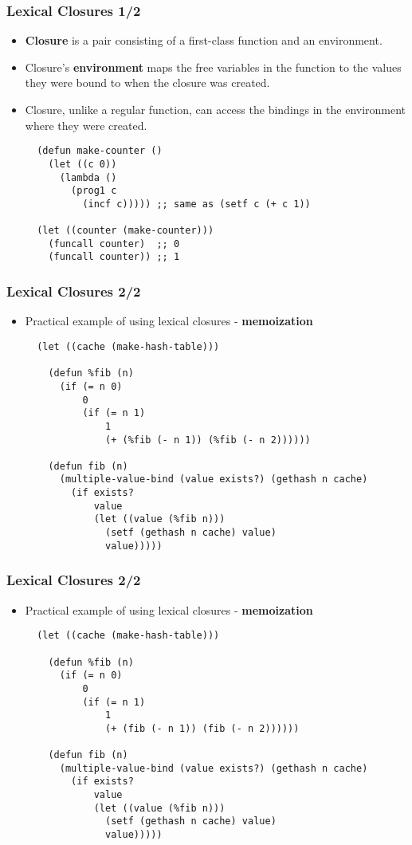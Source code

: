 \documentclass{beamer}
\begin{document}
\begin{frame}[fragile]
  \frametitle{Lexical Closures 1/2}
  \begin{itemize}
  \item \textbf{Closure} is a pair consisting of a first-class function and an
    environment.
  \item Closure's \textbf{environment} maps the free variables in the function
    to the values they were bound to when the closure was created.
  \item Closure, unlike a regular function, can access the bindings in the
    environment where they were created.
\begin{verbatim}
  (defun make-counter ()
    (let ((c 0))
      (lambda () 
        (prog1 c
          (incf c))))) ;; same as (setf c (+ c 1))

  (let ((counter (make-counter)))
    (funcall counter)  ;; 0
    (funcall counter)) ;; 1
\end{verbatim}
  \end{itemize}
\end{frame}

\begin{frame}[fragile]
  \frametitle{Lexical Closures 2/2}
  \begin{itemize}
  \item Practical example of using lexical closures - \textbf{memoization}
\begin{verbatim}
  (let ((cache (make-hash-table)))

    (defun %fib (n)
      (if (= n 0)
          0
          (if (= n 1)
              1
              (+ (%fib (- n 1)) (%fib (- n 2))))))

    (defun fib (n)
      (multiple-value-bind (value exists?) (gethash n cache)
        (if exists?
            value
            (let ((value (%fib n)))
              (setf (gethash n cache) value)
              value)))))
\end{verbatim}
  \end{itemize}
\end{frame}

\begin{frame}[fragile]
  \frametitle{Lexical Closures 2/2}
  \begin{itemize}
  \item Practical example of using lexical closures - \textbf{memoization}
\begin{verbatim}
  (let ((cache (make-hash-table)))

    (defun %fib (n)
      (if (= n 0)
          0
          (if (= n 1)
              1
              (+ (fib (- n 1)) (fib (- n 2))))))

    (defun fib (n)
      (multiple-value-bind (value exists?) (gethash n cache)
        (if exists?
            value
            (let ((value (%fib n)))
              (setf (gethash n cache) value)
              value)))))
\end{verbatim}
  \end{itemize}
\end{frame}
\end{document}
